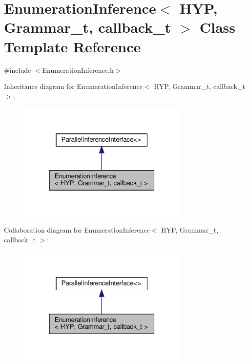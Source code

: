 \hypertarget{class_enumeration_inference}{}\section{Enumeration\+Inference$<$ H\+YP, Grammar\+\_\+t, callback\+\_\+t $>$ Class Template Reference}
\label{class_enumeration_inference}


{\ttfamily \#include $<$Enumeration\+Inference.\+h$>$}



Inheritance diagram for Enumeration\+Inference$<$ H\+YP, Grammar\+\_\+t, callback\+\_\+t $>$\+:\nopagebreak
\begin{figure}[H]
\begin{center}
\leavevmode
\includegraphics[width=241pt]{class_enumeration_inference__inherit__graph}
\end{center}
\end{figure}


Collaboration diagram for Enumeration\+Inference$<$ H\+YP, Grammar\+\_\+t, callback\+\_\+t $>$\+:\nopagebreak
\begin{figure}[H]
\begin{center}
\leavevmode
\includegraphics[width=241pt]{class_enumeration_inference__coll__graph}
\end{center}
\end{figure}
